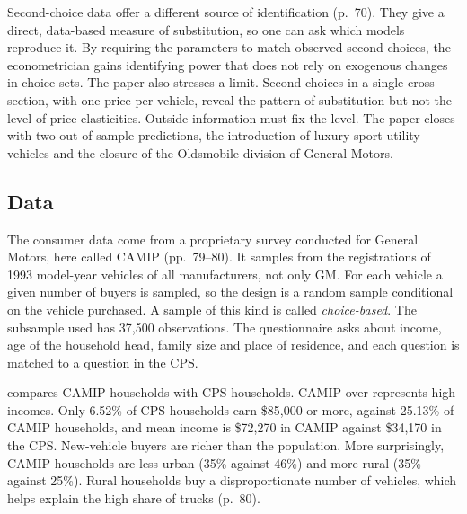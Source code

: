 Second-choice data offer a different source of identification (p.~70). They give a direct, data-based measure
of substitution, so one can ask which models reproduce it. By requiring the parameters to match observed
second choices, the econometrician gains identifying power that does not rely on exogenous changes in choice
sets. The paper also stresses a limit. Second choices in a single cross section, with one price per vehicle,
reveal the pattern of substitution but not the level of price elasticities. Outside information must fix the
level. The paper closes with two out-of-sample predictions, the introduction of luxury sport utility vehicles
and the closure of the Oldsmobile division of General Motors.

\subsection{Data}\label{sec:08-blp04-data}

 The consumer data come from a proprietary survey conducted for General Motors,
here called CAMIP (pp.~79--80). It samples from the registrations of 1993 model-year vehicles of all
manufacturers, not only GM. For each vehicle a given number of buyers is sampled, so the design is a random
sample conditional on the vehicle purchased. A sample of this kind is called \emph{choice-based}. The subsample
used has 37,500 observations. The questionnaire asks about income, age of the household head, family size and
place of residence, and each question is matched to a question in the CPS.

 compares CAMIP households with CPS households. CAMIP over-represents high incomes.
Only 6.52\% of CPS households earn \$85,000 or more, against 25.13\% of CAMIP households, and mean income is
\$72,270 in CAMIP against \$34,170 in the CPS. New-vehicle buyers are richer than the population. More
surprisingly, CAMIP households are less urban (35\% against 46\%) and more rural (35\% against 25\%).
Rural households buy a disproportionate number of vehicles, which helps explain the high share of trucks
(p.~80).


